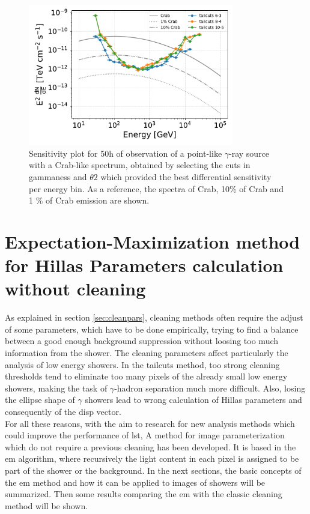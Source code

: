 \documentclass[main.tex]{subfiles}
\begin{document}
\begin{figure}
\centering
 \includegraphics[width=0.8\textwidth]{Pictures/sensitivity.pdf}
  \caption{Sensitivity plot for 50h of observation of a point-like $\gamma$-ray source with a Crab-like spectrum, obtained by selecting the cuts in gammaness and $\theta2$ which provided the best differential sensitivity per energy bin. As a reference, the spectra of Crab, 10\% of Crab and 1 \% of Crab emission are shown.}
    \label{fig:sens}
\end{figure}

\section[Expectation-Maximization method for Hillas Parameters...]{Expectation-Maximization method for Hillas Parameters calculation without cleaning} \label{sec:EM}

As explained in section \ref{sec:cleanpars}, cleaning methods often require the adjust of some parameters, which have to be done empirically, trying to find a balance between a good enough background suppression without loosing too much information from the shower. The cleaning parameters affect particularly the analysis of low energy showers. In the tailcuts method, too strong cleaning thresholds tend to eliminate too many pixels of the already small low energy showers, making the task of $\gamma$-hadron separation much more difficult. Also, losing the ellipse shape of $\gamma$ showers lead to wrong calculation of Hillas parameters and consequently of the disp vector.\\
For all these reasons, with the aim to research for new analysis methods which could improve the performance of \gls{lst}, A method for image parameterization which do not require a previous cleaning has been developed. It is based in the \gls{em} algorithm, where recursively the light content in each pixel is assigned to be part of the shower or the background. In the next sections, the basic concepts of the \gls{em} method and how it can be applied to images of showers will be summarized. Then some results comparing the \gls{em} with the classic cleaning method will be shown. 
\end{document}
